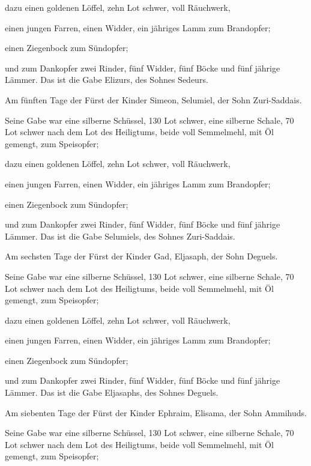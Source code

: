  dazu einen goldenen Löffel, zehn Lot schwer, voll
Räuchwerk,

 einen jungen Farren, einen Widder, ein jähriges Lamm zum
Brandopfer;

 einen Ziegenbock zum Sündopfer;

 und zum Dankopfer zwei Rinder, fünf Widder, fünf Böcke
und fünf jährige Lämmer. Das ist die Gabe Elizurs, des Sohnes Sedeurs.

 Am fünften Tage der Fürst der Kinder Simeon, Selumiel,
der Sohn Zuri-Saddais.

 Seine Gabe war eine silberne Schüssel, 130 Lot schwer,
eine silberne Schale, 70 Lot schwer nach dem Lot des Heiligtums, beide
voll Semmelmehl, mit Öl gemengt, zum Speisopfer;

 dazu einen goldenen Löffel, zehn Lot schwer, voll
Räuchwerk,

 einen jungen Farren, einen Widder, ein jähriges Lamm zum
Brandopfer;

 einen Ziegenbock zum Sündopfer;

 und zum Dankopfer zwei Rinder, fünf Widder, fünf Böcke
und fünf jährige Lämmer. Das ist die Gabe Selumiels, des Sohnes
Zuri-Saddais.

 Am sechsten Tage der Fürst der Kinder Gad, Eljasaph, der
Sohn Deguels.

 Seine Gabe war eine silberne Schüssel, 130 Lot schwer,
eine silberne Schale, 70 Lot schwer nach dem Lot des Heiligtums, beide
voll Semmelmehl, mit Öl gemengt, zum Speisopfer;

 dazu einen goldenen Löffel, zehn Lot schwer, voll
Räuchwerk,

 einen jungen Farren, einen Widder, ein jähriges Lamm zum
Brandopfer;

 einen Ziegenbock zum Sündopfer;

 und zum Dankopfer zwei Rinder, fünf Widder, fünf Böcke
und fünf jährige Lämmer. Das ist die Gabe Eljasaphs, des Sohnes Deguels.

 Am siebenten Tage der Fürst der Kinder Ephraim, Elisama,
der Sohn Ammihuds.

 Seine Gabe war eine silberne Schüssel, 130 Lot schwer,
eine silberne Schale, 70 Lot schwer nach dem Lot des Heiligtums, beide
voll Semmelmehl, mit Öl gemengt, zum Speisopfer;

